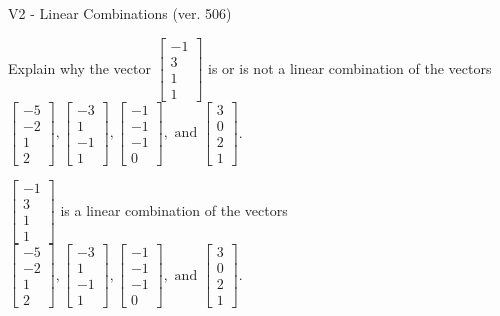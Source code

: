 \begin{exercise}
  \begin{exerciseTitle}V2 - Linear Combinations (ver. 506)\end{exerciseTitle}
  \begin{exerciseStatement}
    Explain why the vector \(\left[\begin{array}{c}
-1 \\
3 \\
1 \\
1
\end{array}\right]\)  is or is not a linear 
	combination of the vectors \(\left[\begin{array}{c}
-5 \\
-2 \\
1 \\
2
\end{array}\right] , \left[\begin{array}{c}
-3 \\
1 \\
-1 \\
1
\end{array}\right] , \left[\begin{array}{c}
-1 \\
-1 \\
-1 \\
0
\end{array}\right] , \text{ and } \left[\begin{array}{c}
3 \\
0 \\
2 \\
1
\end{array}\right]\).
	


  \end{exerciseStatement}
  \begin{exerciseAnswer}
   \(\left[\begin{array}{c}
-1 \\
3 \\
1 \\
1
\end{array}\right]\) 
  	 is  
	a linear combination of the vectors \(\left[\begin{array}{c}
-5 \\
-2 \\
1 \\
2
\end{array}\right] , \left[\begin{array}{c}
-3 \\
1 \\
-1 \\
1
\end{array}\right] , \left[\begin{array}{c}
-1 \\
-1 \\
-1 \\
0
\end{array}\right] , \text{ and } \left[\begin{array}{c}
3 \\
0 \\
2 \\
1
\end{array}\right]\).


\end{exerciseAnswer}
\end{exercise}
